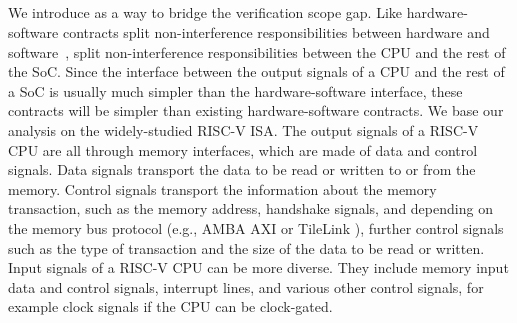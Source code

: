 
\subsection{\Pics}
\label{subsec:pics_section}

\para{\Pics}
We introduce \pics as a way to bridge the verification scope gap.
Like hardware-software contracts split non-interference responsibilities between hardware and software~\cite{guarnieri2021hardware}, \pics split non-interference responsibilities between the CPU and the rest of the SoC.
Since the interface between the output signals of a CPU and the rest of a SoC is usually much simpler than the hardware-software interface, these contracts will be simpler than existing hardware-software contracts.
We base our analysis on the widely-studied RISC-V ISA.
The output signals of a RISC-V CPU are all through memory interfaces, which are made of data and control signals.
Data signals transport the data to be read or written to or from the memory.
Control signals transport the information about the memory transaction, such as the memory address, handshake signals, and depending on the memory bus protocol (e.g., AMBA AXI \cite{arm_amba_axi4} or TileLink \cite{tilelink_spec}), further control signals such as the type of transaction and the size of the data to be read or written.
Input signals of a RISC-V CPU can be more diverse.
They include memory input data and control signals, interrupt lines, and various other control signals, for example clock signals if the CPU can be clock-gated.

